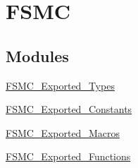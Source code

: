 \hypertarget{group__FSMC}{
\section{FSMC}
\label{group__FSMC}
}
\subsection*{Modules}
\begin{DoxyCompactItemize}
\item 
\hyperlink{group__FSMC__Exported__Types}{FSMC\_\-Exported\_\-Types}
\item 
\hyperlink{group__FSMC__Exported__Constants}{FSMC\_\-Exported\_\-Constants}
\item 
\hyperlink{group__FSMC__Exported__Macros}{FSMC\_\-Exported\_\-Macros}
\item 
\hyperlink{group__FSMC__Exported__Functions}{FSMC\_\-Exported\_\-Functions}
\end{DoxyCompactItemize}
